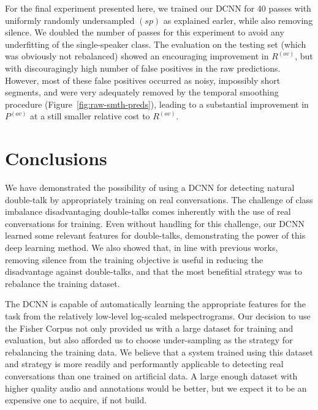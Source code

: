 \documentclass[a4paper]{article}
\begin{document}
For the final experiment presented here,
we trained our DCNN for 40 passes with uniformly randomly undersampled $(sp)$ as explained earler, while also removing silence.
We doubled the number of passes for this experiment to avoid any underfitting of the single-speaker class.
The evaluation on the testing set (which was obviously not rebalanced) showed an encouraging improvement in $R^{(ov)}$,
but with discouragingly high number of false positives in the raw predictions.
However, most of these false positives occurred as noisy, impossibly short segments,
and were very adequately removed by the temporal smoothing procedure (Figure~\ref{fig:raw-smth-preds}),
leading to a substantial improvement in $P^{(ov)}$ at a still smaller relative cost to $R^{(ov)}$.

\section{Conclusions}
We have demonstrated the possibility of using a DCNN for detecting natural double-talk by appropriately training on real conversations.
The challenge of class imbalance disadvantaging double-talks comes inherently with the use of real conversations for training.
Even without handling for this challenge, our DCNN learned some relevant features for double-talks,
demonstrating the power of this deep learning method.
We also showed that, in line with previous works,
removing silence from the training objective is useful in reducing the disadvantage against double-talks,
and that the most benefitial strategy was to rebalance the training dataset.

The DCNN is capable of automatically learning the appropriate features for the task from the relatively low-level log-scaled melspectrograms.
Our decision to use the Fisher Corpus not only provided us with a large dataset for training and evaluation,
but also afforded us to choose under-sampling as the strategy for rebalancing the training data.
We believe that a system trained using this dataset and strategy is more readily and performantly applicable to detecting real conversations than one trained on artificial data.
A large enough dataset with higher quality audio and annotations would be better,
but we expect it to be an expensive one to acquire, if not build.
\end{document}
